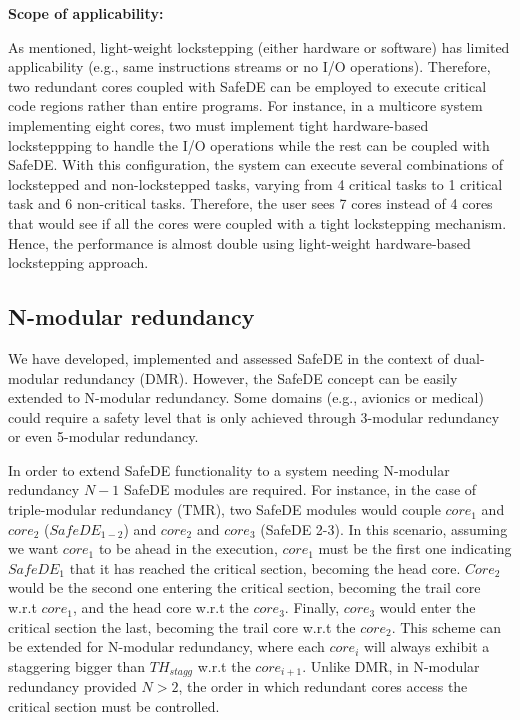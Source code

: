 \bigskip

\textbf{Scope of applicability:}

As mentioned, light-weight lockstepping (either hardware or software) has limited applicability (e.g., same instructions streams or no I/O operations). Therefore, two redundant cores coupled with SafeDE can be employed to execute critical code regions rather than entire programs. For instance, in a multicore system implementing eight cores, two must implement tight hardware-based locksteppping to handle the I/O operations while the rest can be coupled with SafeDE. With this configuration, the system can execute several combinations of lockstepped and non-lockstepped tasks, varying from 4 critical tasks to 1 critical task and 6 non-critical tasks. Therefore, the user sees 7 cores instead of 4 cores that would see if all the cores were coupled with a tight lockstepping mechanism. Hence, the performance is almost double using light-weight hardware-based lockstepping approach.

\bigskip




\subsection{N-modular redundancy}

We have developed, implemented and assessed SafeDE in the context of dual-modular redundancy (DMR). However, the SafeDE concept can be easily extended to N-modular redundancy. Some domains (e.g., avionics or medical) could require a safety level that is only achieved through 3-modular redundancy or even 5-modular redundancy. 

In order to extend SafeDE functionality to a system needing N-modular redundancy $N-1$ SafeDE modules are required. For instance, in the case of triple-modular redundancy (TMR), two SafeDE modules would couple $core_1$ and $core_2$ ($SafeDE_{1-2}$) and $core_2$ and $core_3$ (SafeDE 2-3). In this scenario, assuming we want $core_1$ to be ahead in the execution, $core_1$ must be the first one indicating $SafeDE_1$ that it has reached the critical section, becoming the head core. $Core_2$ would be the second one entering the critical section, becoming the trail core w.r.t $core_1$, and the head core w.r.t the $core_3$. Finally, $core_3$ would enter the critical section the last, becoming the trail core w.r.t the $core_2$. This scheme can be extended for N-modular redundancy, where each $core_i$ will always exhibit a staggering  bigger than $TH_{stagg}$ w.r.t the $core_{i+1}$. Unlike DMR, in N-modular redundancy provided $N>2$, the order in which redundant cores access the critical section must be controlled.  

